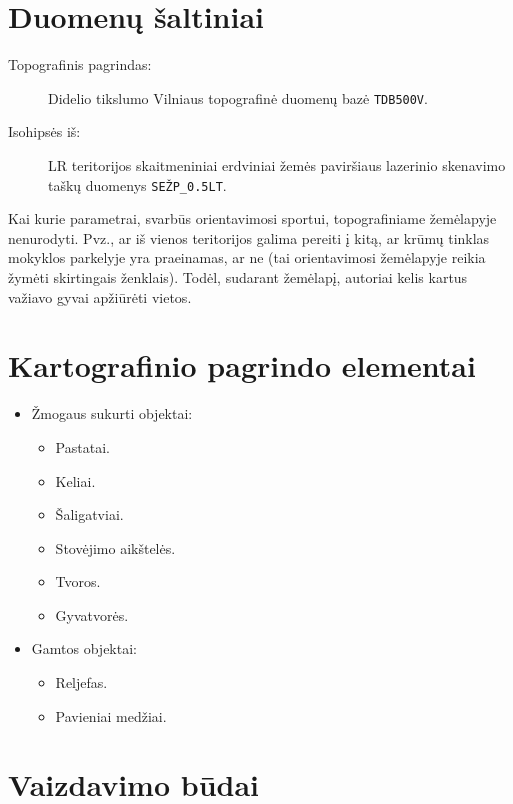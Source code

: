 \documentclass{article}
\begin{document}
\section{Duomenų šaltiniai}

\begin{description}
    \item[Topografinis pagrindas:] Didelio tikslumo Vilniaus topografinė
        duomenų bazė \texttt{TDB500V}.

    \item[Isohipsės iš:]  LR teritorijos skaitmeniniai erdviniai žemės
        paviršiaus lazerinio skenavimo taškų duomenys \texttt{SEŽP\_0.5LT}.

\end{description}

Kai kurie parametrai, svarbūs orientavimosi sportui, topografiniame žemėlapyje
nenurodyti. Pvz., ar iš vienos teritorijos galima pereiti į kitą, ar krūmų
tinklas mokyklos parkelyje yra praeinamas, ar ne (tai orientavimosi žemėlapyje
reikia žymėti skirtingais ženklais). Todėl, sudarant žemėlapį, autoriai kelis
kartus važiavo gyvai apžiūrėti vietos.

\section{Kartografinio pagrindo elementai}

\begin{itemize}
    \item Žmogaus sukurti objektai:
        \begin{itemize}
            \item Pastatai.
            \item Keliai.
            \item Šaligatviai.
            \item Stovėjimo aikštelės.
            \item Tvoros.
            \item Gyvatvorės.
        \end{itemize}
    \item Gamtos objektai:
        \begin{itemize}
            \item Reljefas.
            \item Pavieniai medžiai.
        \end{itemize}
\end{itemize}

\section{Vaizdavimo būdai}
\end{document}
